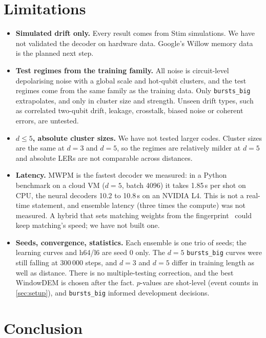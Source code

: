 \documentclass[11pt,a4paper]{article}
\newcommand{\reg}[1]{\texttt{#1}}
\begin{document}
\section{Limitations}\label{sec:limitations}

\begin{itemize}
  \item \textbf{Simulated drift only.} Every result comes from Stim simulations. We have not validated the decoder on
        hardware data. Google's Willow memory data~\cite{google2025below} is the planned next step.
  \item \textbf{Test regimes from the training family.} All noise is circuit-level depolarising noise with a global
        scale and hot-qubit clusters, and the test regimes come from the same family as the training data. Only
        \reg{bursts\_big} extrapolates, and only in cluster size and strength. Unseen drift types, such as correlated
        two-qubit drift, leakage, crosstalk, biased noise or coherent errors, are untested.
  \item \textbf{$d\le5$, absolute cluster sizes.} We have not tested larger codes. Cluster sizes are the same at $d=3$
        and $d=5$, so the regimes are relatively milder at $d=5$ and absolute LERs are not comparable across distances.
  \item \textbf{Latency.} MWPM is the fastest decoder we measured: in a Python benchmark on a cloud VM ($d=5$, batch 4096)
        it takes 1.85\,\textmu s per shot on CPU, the neural decoders 10.2 to 10.8\,\textmu s on an NVIDIA L4. This is not
        a real-time statement, and ensemble latency (three times the compute) was not measured. A hybrid that sets
        matching weights from the fingerprint~\cite{peled2026nmwpm,chamberland2026predecoder} could keep matching's
        speed; we have not built one.
  \item \textbf{Seeds, convergence, statistics.} Each ensemble is one trio of seeds; the learning curves and h64/l6 are
        seed 0 only. The $d=5$ \reg{bursts\_big} curves were still falling at 300\,000 steps, and $d=3$ and $d=5$ differ in
        training length as well as distance. There is no multiple-testing correction, and the best WindowDEM is chosen
        after the fact. $p$-values are shot-level (event counts in \cref{sec:setup}), and
        \reg{bursts\_big} informed development decisions.
\end{itemize}

\section{Conclusion}\label{sec:conclusion}
\end{document}
